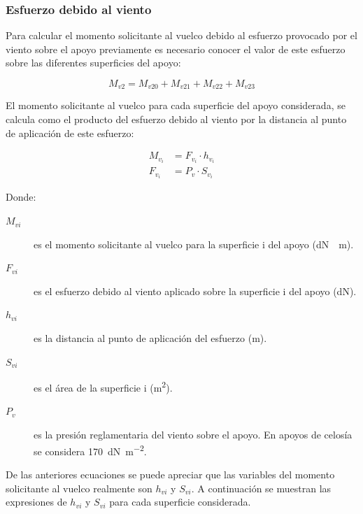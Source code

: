 \subsubsection{Esfuerzo debido al viento}
\label{subsubsec:momento-vuelco2}
Para calcular el momento solicitante al vuelco debido al esfuerzo provocado por el viento sobre el apoyo previamente es necesario conocer el valor de este esfuerzo sobre las diferentes superficies del apoyo:

\begin{equation}
    M_{v2} = M_{v20}+M_{v21}+M_{v22}+M_{v23}
    \label{eq:momento-vuelco2}
\end{equation}

El momento solicitante al vuelco para cada superficie del apoyo considerada, se calcula como el producto del esfuerzo debido al viento por la distancia al punto de aplicación de este esfuerzo:

\begin{align}
    M_{v_{i}} &= F_{v_{i}}\cdot h_{v_{i}}
    \label{eq:momento-vuelco2i}\\[0.5em]
    F_{v_{i}} &= P_v \cdot S_{v_{i}}
    \label{eq:esfuerzo-viento}
\end{align}

Donde:
\begin{description}
    \item[$M_{vi}$] es el momento solicitante al vuelco para la superficie i del apoyo (\si{\deca\newton\cdot\meter}).
    \item[$F_{vi}$] es el esfuerzo debido al viento aplicado sobre la superficie i del apoyo (\si{\deca\newton}).
    \item[$h_{vi}$] es la distancia al punto de aplicación del esfuerzo (\si{\meter}).
    \item[$S_{vi}$] es el área de la superficie i (\si{\meter\squared}).
    \item[$P_v$] es la presión reglamentaria del viento sobre el apoyo. En apoyos de celosía se considera \SI{170}{\deca\newton\per\meter\squared}.
\end{description}

De las anteriores ecuaciones se puede apreciar que las variables del momento solicitante al vuelco realmente son $h_{vi}$ y $S_{vi}$. A continuación se muestran las expresiones de $h_{vi}$ y $S_{vi}$ para cada superficie considerada.

